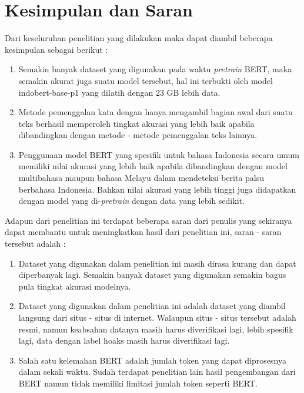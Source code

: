 \section{Kesimpulan dan Saran}
\label{sec:kesimpulandansaran}

Dari keseluruhan penelitian yang dilakukan maka dapat diambil beberapa kesimpulan sebagai berikut :

\begin{enumerate}
    \item Semakin banyak dataset yang digunakan pada waktu \textit{pretrain} BERT, maka semakin akurat juga suatu model tersebut, hal ini terbukti oleh model indobert-base-p1 yang dilatih dengan 23 GB lebih data.
    \item Metode pemenggalan kata dengan hanya mengambil bagian awal dari suatu teks berhasil memperoleh tingkat akurasi yang lebih baik apabila dibandingkan dengan metode - metode pemenggalan teks lainnya.
    \item Penggunaan model BERT yang spesifik untuk bahasa Indonesia secara umum memiliki nilai akurasi yang lebih baik apabila dibandingkan dengan model multibahasa maupun bahasa Melayu dalam mendeteksi berita palsu berbahasa Indonesia. Bahkan nilai akurasi yang lebih tinggi juga didapatkan dengan model yang di-\textit{pretrain} dengan data yang lebih sedikit.
\end{enumerate}

Adapun dari penelitian ini terdapat beberapa saran dari penulis yang sekiranya dapat membantu untuk meningkatkan hasil dari penelitian ini, saran - saran tersebut adalah :

\begin{enumerate}
    \item Dataset yang digunakan dalam penelitian ini masih dirasa kurang dan dapat diperbanyak lagi. Semakin banyak dataset yang digunakan semakin bagus pula tingkat akurasi modelnya.
    \item Dataset yang digunakan dalam penelitian ini adalah dataset yang diambil langsung dari situs - situs di internet. Walaupun situs - situs tersebut adalah resmi, namun keabsahan datanya masih harus diverifikasi lagi, lebih spesifik lagi, data dengan label hoaks masih harus diverifikasi lagi.
    \item Salah satu kelemahan BERT adalah jumlah token yang dapat diprosesnya dalam sekali waktu. Sudah terdapat penelitian lain hasil pengembangan dari BERT namun tidak memiliki limitasi jumlah token seperti BERT.
\end{enumerate}
